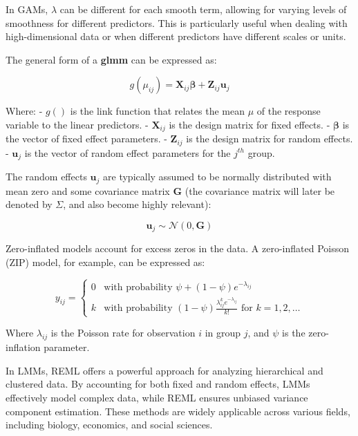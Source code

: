 In GAMs, \( \lambda \) can be different for each smooth term, allowing for varying levels of smoothness for different predictors. This is particularly useful when dealing with high-dimensional data or when different predictors have different scales or units.




The general form of a \textbf{glmm} can be expressed as:

\[
g(\mu_{ij}) = \mathbf{X}_{ij} \boldsymbol{\beta} + \mathbf{Z}_{ij} \mathbf{u}_{j}
\]

Where:
- \( g() \) is the link function that relates the mean \( \mu \) of the response variable to the linear predictors.
- \( \mathbf{X}_{ij} \) is the design matrix for fixed effects.
- \( \boldsymbol{\beta} \) is the vector of fixed effect parameters.
- \( \mathbf{Z}_{ij} \) is the design matrix for random effects.
- \( \mathbf{u}_{j} \) is the vector of random effect parameters for the \( j^{th} \) group.

The random effects \( \mathbf{u}_{j} \) are typically assumed to be normally distributed with mean zero and some covariance matrix \( \mathbf{G} \) (the covariance matrix will later be denoted by $\Sigma$, and also become highly relevant):

\[
\mathbf{u}_{j} \sim \mathcal{N}(0, \mathbf{G})
\]

Zero-inflated models account for excess zeros in the data. A zero-inflated Poisson (ZIP) model, for example, can be expressed as:

\[
y_{ij} = 
\begin{cases} 
0 & \text{with probability } \psi + (1-\psi)e^{-\lambda_{ij}} \\
k & \text{with probability } (1-\psi)\frac{\lambda_{ij}^k e^{-\lambda_{ij}}}{k!} \text{ for } k=1,2,\ldots
\end{cases}
\]

Where \( \lambda_{ij} \) is the Poisson rate for observation \( i \) in group \( j \), and \( \psi \) is the zero-inflation parameter.



In LMMs, REML offers a powerful approach for analyzing hierarchical and clustered data. By accounting for both fixed and random effects, LMMs effectively model complex data, while REML ensures unbiased variance component estimation. These methods are widely applicable across various fields, including biology, economics, and social sciences.






